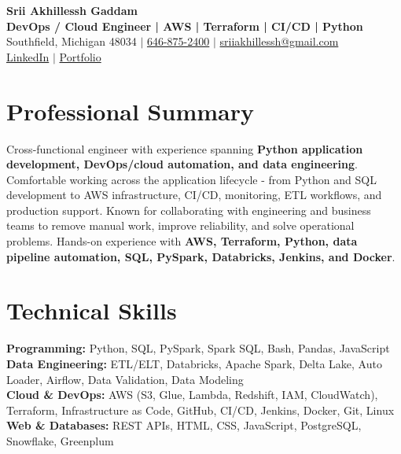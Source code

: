 \documentclass[letterpaper,10pt]{article}
\begin{document}
\fontsize{9.35pt}{10.45pt}\selectfont

\begin{center}
    {\LARGE \textbf{Srii Akhillessh Gaddam}} \\[-1pt]
    \textbf{DevOps / Cloud Engineer | AWS | Terraform | CI/CD | Python} \\[2pt]
    Southfield, Michigan 48034 $|$
    \href{tel:6468752400}{646-875-2400} $|$
    \href{mailto:sriiakhillessh@gmail.com}{sriiakhillessh@gmail.com} \\[1pt]
    \href{https://www.linkedin.com/in/srii-akhiilessh-gaddam-b48668191/}{LinkedIn} $|$
    \href{https://sriiakhillesshg.github.io/portfolio/}{Portfolio}
\end{center}
\vspace{-8pt}

\section{Professional Summary}
\small{Cross-functional engineer with experience spanning \textbf{Python application development, DevOps/cloud automation, and data engineering}. Comfortable working across the application lifecycle - from Python and SQL development to AWS infrastructure, CI/CD, monitoring, ETL workflows, and production support. Known for collaborating with engineering and business teams to remove manual work, improve reliability, and solve operational problems. Hands-on experience with \textbf{AWS, Terraform, Python, data pipeline automation, SQL, PySpark, Databricks, Jenkins, and Docker}.}

\section{Technical Skills}
\small{
\textbf{Programming:} Python, SQL, PySpark, Spark SQL, Bash, Pandas, JavaScript \\
\textbf{Data Engineering:} ETL/ELT, Databricks, Apache Spark, Delta Lake, Auto Loader, Airflow, Data Validation, Data Modeling \\
\textbf{Cloud \& DevOps:} AWS (S3, Glue, Lambda, Redshift, IAM, CloudWatch), Terraform, Infrastructure as Code, GitHub, CI/CD, Jenkins, Docker, Git, Linux \\
\textbf{Web \& Databases:} REST APIs, HTML, CSS, JavaScript, PostgreSQL, Snowflake, Greenplum
}
\end{document}
